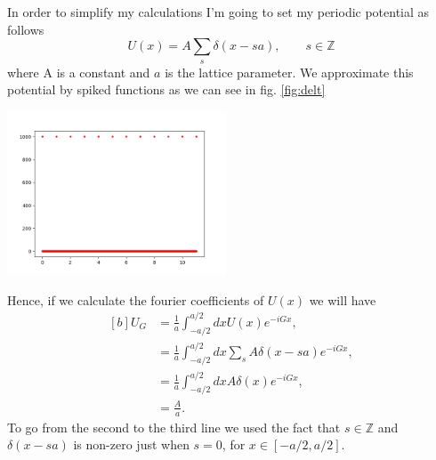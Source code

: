 
\begin{questions}
\begin{solution}
  In order to simplify my calculations I'm going to set my periodic potential as follows
  \begin{equation}
    U(x) = A\sum_{s}\delta(x-sa),\qquad s\in \mathbb{Z}
  \end{equation}
  where A is a constant and $a$ is the lattice parameter. We approximate this potential by spiked functions as we can see in fig. \ref{fig:delt}

  \begin{center}
    \includegraphics[width=65mm]{delta}
  \end{center}

  \label{fig:delt}\vspace{0.5cm}

  Hence, if we calculate the fourier coefficients of $U(x)$ we will have
  \begin{equation}
    \begin{aligned}[b]
      U_G &= \frac{1}{a}\int_{-a/2}^{a/2}dx U(x)e^{-iGx},\\
      &= \frac{1}{a}\int_{-a/2}^{a/2}dx \sum_s A \delta (x-sa)e^{-iGx},\\
      &= \frac{1}{a}\int_{-a/2}^{a/2}dx A \delta (x)e^{-iGx},\\
      &= \frac{A}{a}.
    \end{aligned}
  \end{equation}
To go from the second to the third line we used the fact that $s\in \mathbb{Z}$ and $\delta (x-sa)$ is non-zero just when $s=0$, for $x\in [-a/2,a/2].$


\end{solution}
\end{questions}
